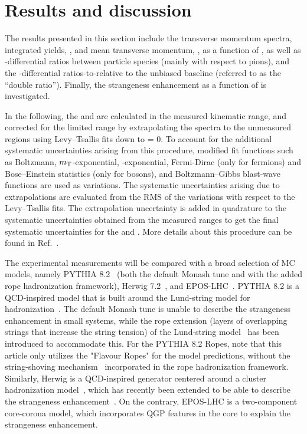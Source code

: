 \section{Results and discussion}\label{Sec:Results}
 
The results presented in this section include the transverse momentum spectra, integrated yields, \myield, and mean transverse momentum, \mpt, as a function of \SOPT, as well as \pt-differential ratios between particle species (mainly with respect to pions), and the \pt-differential ratios-to-\PI relative to the \SOPT unbiased baseline (referred to as the ``double ratio''). Finally, the strangeness enhancement as a function of \SOPT is investigated.



In the following, the \myield and \mpt are calculated in the measured kinematic range, and corrected for the limited range by extrapolating the spectra to the unmeasured \pt regions using Levy--Tsallis fits down to \pt = 0. To account for the additional systematic uncertainties arising from this procedure, modified fit functions such as Boltzmann, $m_{\rm T}$-exponential, \pt-exponential, Fermi-Dirac (only for fermions) and Bose--Einstein statistics (only for bosons), and Boltzmann--Gibbs blast-wave functions are used as variations. The systematic uncertainties arising due to extrapolations are evaluated from the RMS of the variations with respect to the Levy--Tsallis fits. The extrapolation uncertainty is added in quadrature to the systematic uncertainties obtained from the measured \pt ranges to get the final systematic uncertainties for the \myield and \mpt. More details about this procedure can be found in Ref.~\cite{alice_newstrangeness}.


The experimental measurements will be compared with a broad selection of \pp MC models, namely PYTHIA 8.2~\cite{Torbjorn} (both the default Monash tune and with the added rope hadronization framework), Herwig 7.2~\cite{Herwig}, and EPOS-LHC~\cite{EPOS-LHC}. PYTHIA 8.2 is a QCD-inspired model that is built around the Lund-string model for hadronization~\cite{pythia8}. The default Monash tune is unable to describe the strangeness enhancement in small systems, while the rope extension (layers of overlapping strings that increase the string tension) of the Lund-string model~\cite{Ropes} has been introduced to accommodate this. For the PYTHIA 8.2 Ropes, note that this article only utilizes the "Flavour Ropes" for the model predictions, without the string-shoving mechanism~\cite{Bierlich:2016vgw} incorporated in the rope hadronization framework. Similarly, Herwig is a QCD-inspired \pp generator centered around a cluster hadronization model~\cite{Herwig}, which has recently been extended to be able to describe the strangeness enhancement~\cite{ALICE:2020nkc}. On the contrary, EPOS-LHC is a two-component core-corona model, which incorporates QGP features in the core to explain the strangeness enhancement.


